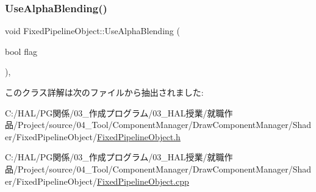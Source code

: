 \mbox{\label{class_fixed_pipeline_object_a344573cb9c6222166ef315788e5ba25a}} 
\subsubsection{\texorpdfstring{Use\+Alpha\+Blending()}{UseAlphaBlending()}}
{\footnotesize\ttfamily void Fixed\+Pipeline\+Object\+::\+Use\+Alpha\+Blending (\begin{DoxyParamCaption}\item[{bool}]{flag }\end{DoxyParamCaption})\hspace{0.3cm}{\ttfamily [inline]}, {\ttfamily [static]}}



このクラス詳解は次のファイルから抽出されました\+:\begin{DoxyCompactItemize}
\item 
C\+:/\+H\+A\+L/\+P\+G関係/03\+\_\+作成プログラム/03\+\_\+\+H\+A\+L授業/就職作品/\+Project/source/04\+\_\+\+Tool/\+Component\+Manager/\+Draw\+Component\+Manager/\+Shader/\+Fixed\+Pipeline\+Object/\mbox{\hyperlink{_fixed_pipeline_object_8h}{Fixed\+Pipeline\+Object.\+h}}\item 
C\+:/\+H\+A\+L/\+P\+G関係/03\+\_\+作成プログラム/03\+\_\+\+H\+A\+L授業/就職作品/\+Project/source/04\+\_\+\+Tool/\+Component\+Manager/\+Draw\+Component\+Manager/\+Shader/\+Fixed\+Pipeline\+Object/\mbox{\hyperlink{_fixed_pipeline_object_8cpp}{Fixed\+Pipeline\+Object.\+cpp}}\end{DoxyCompactItemize}
